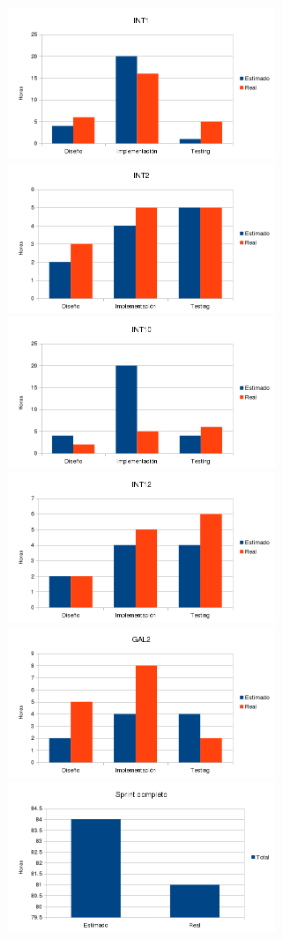     \includegraphics[width=0.53\textwidth]{img/Hint1.png}
    \includegraphics[width=0.53\textwidth]{img/Hint2.png}
    \includegraphics[width=0.53\textwidth]{img/Hint10.png}
    \includegraphics[width=0.53\textwidth]{img/Hint12.png}
    \includegraphics[width=0.53\textwidth]{img/Hgal2.png}
    \includegraphics[width=0.53\textwidth]{img/Hsprint.png}


